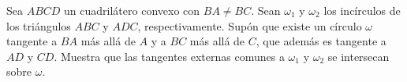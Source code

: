 Sea $ABCD$ un cuadrilátero convexo con $BA\neq BC$. Sean $\omega_1$ y $\omega_2$ los incírculos de los triángulos $ABC$ y $ADC$, respectivamente. Supón que existe un círculo $\omega$ tangente a $BA$ más allá de $A$ y a $BC$ más allá de $C$, que además es tangente a $AD$ y $CD$. Muestra que las tangentes externas comunes a $\omega_1$ y $\omega_2$ se intersecan sobre $\omega$.